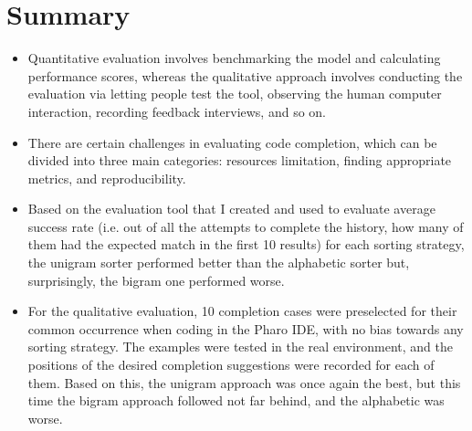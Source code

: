 \section{Summary}
\label{sec:Evaluation-Summary}
\begin{itemize}
    \item Quantitative evaluation involves benchmarking the model and calculating performance scores, whereas the qualitative approach involves conducting the evaluation via letting people test the tool, observing the human computer interaction, recording feedback interviews, and so on.
    \item There are certain challenges in evaluating code completion, which can be divided into three main categories: resources limitation, finding appropriate metrics, and reproducibility.
    \item Based on the evaluation tool that I created and used to evaluate average success rate (i.e. out of all the attempts to complete the history, how many of them had the expected match in the first 10 results) for each sorting strategy, the unigram sorter performed better than the alphabetic sorter but, surprisingly, the bigram one performed worse.
    \item For the qualitative evaluation, 10 completion cases were preselected for their common occurrence when coding in the Pharo IDE, with no bias towards any sorting strategy. The examples were tested in the real environment, and the positions of the desired completion suggestions were recorded for each of them. Based on this, the unigram approach was once again the best, but this time the bigram approach followed not far behind, and the alphabetic was worse.
\end{itemize}